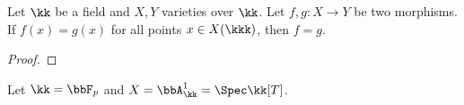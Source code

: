     \begin{proposition}\label{prop:closed_points_determines_morphism}
        Let \(\kk\) be a field and \(X,Y\) varieties over \(\kk\).
        Let \(f,g : X \to Y\) be two morphisms.
        If \(f(x) = g(x)\) for all points \(x \in X(\kkk)\), then \(f = g\).
    \end{proposition}
    \begin{proof}
    \end{proof}

    \begin{example}\label{eg:relative_Frobenius_of_affine_line_does_not_coincide_with_identity_on_closed_points}
        Let \(\kk = \bbF_p\) and \(X = \bbA^1_\kk = \Spec \kk[T]\).
    \end{example}